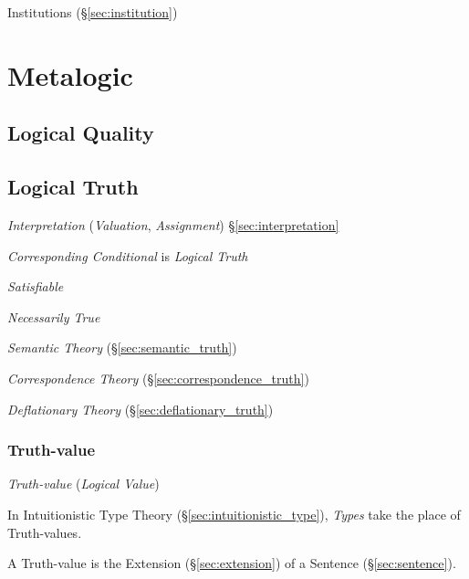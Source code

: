 Institutions (\S\ref{sec:institution})



\section{Metalogic}\label{sec:metalogic}

\subsection{Logical Quality}\label{sec:logical_quality}

\subsection{Logical Truth}\label{sec:logical_truth}

\emph{Interpretation} (\emph{Valuation}, \emph{Assignment})
\S\ref{sec:interpretation}

\emph{Corresponding Conditional} is \emph{Logical Truth}

\emph{Satisfiable}

\emph{Necessarily True}

\emph{Semantic Theory} (\S\ref{sec:semantic_truth})

\emph{Correspondence Theory} (\S\ref{sec:correspondence_truth})

\emph{Deflationary Theory} (\S\ref{sec:deflationary_truth})



\subsubsection{Truth-value}\label{sec:truth_value}

\emph{Truth-value} (\emph{Logical Value})

In Intuitionistic Type Theory (\S\ref{sec:intuitionistic_type}),
\emph{Types} take the place of Truth-values.

A Truth-value is the Extension (\S\ref{sec:extension}) of a Sentence
(\S\ref{sec:sentence}).

